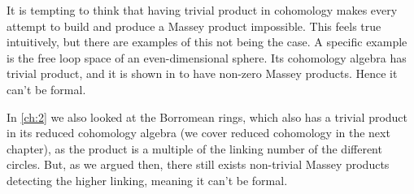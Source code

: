 It is tempting to think that having trivial product in cohomology makes every attempt to build and produce a Massey product impossible. This feels true intuitively, but there are examples of this not being the case. A specific example is the free loop space of an even-dimensional sphere. Its cohomology algebra has trivial product, and it is shown in \cite[Theorem 3.5]{nonformal_loop} to have non-zero Massey products. Hence it can't be formal. 

In \cref{ch:2} we also looked at the Borromean rings, which also has a trivial product in its reduced cohomology algebra (we cover reduced cohomology in the next chapter), as the product is a multiple of the linking number of the different circles. But, as we argued then, there still exists non-trivial Massey products detecting the higher linking, meaning it can't be formal. 



